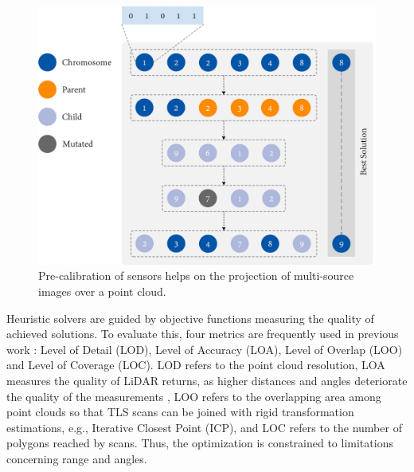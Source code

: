 \begin{figure}[!ht]
	\includegraphics[width=\linewidth]{figs/context/genetic_algorithm.png}
	\caption{Pre-calibration of sensors helps on the projection of multi-source images over a point cloud.}
    \label{fig:genetic_algorithm}
\end{figure}

Heuristic solvers are guided by objective functions measuring the quality of achieved solutions. To evaluate this, four metrics are frequently used in previous work \cite{li_3d_2022, aryan_planning_2021}: Level of Detail (LOD), Level of Accuracy (LOA), Level of Overlap (LOO) and Level of Coverage (LOC). LOD refers to the point cloud resolution, LOA measures the quality of LiDAR returns, as higher distances and angles deteriorate the quality of the measurements \cite{ aryan_planning_2021}, LOO refers to the overlapping area among point clouds so that TLS scans can be joined with rigid transformation estimations, e.g., Iterative Closest Point (ICP), and LOC refers to the number of polygons reached by scans. Thus, the optimization is constrained to limitations concerning range and angles. 

